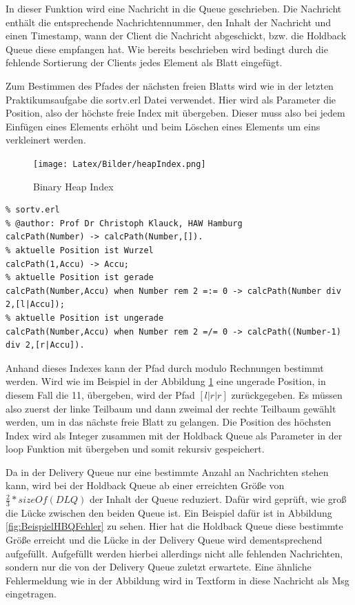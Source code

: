 In dieser Funktion wird eine Nachricht in die Queue geschrieben. Die Nachricht enthält die entsprechende Nachrichtennummer, den Inhalt der Nachricht und einen Timestamp, wann der Client die Nachricht abgeschickt, bzw. die Holdback Queue diese empfangen hat. Wie bereits beschrieben wird bedingt durch die fehlende Sortierung der Clients jedes Element als Blatt eingefügt.
 
Zum Bestimmen des Pfades der nächsten freien Blatts wird wie in der letzten Praktikumsaufgabe die sortv.erl Datei \cite{sortv} verwendet. Hier wird als Parameter die Position, also der höchste freie Index mit übergeben. Dieser muss also bei jedem Einfügen eines Elements erhöht und beim Löschen eines Elements um eins verkleinert werden. 

\begin{figure}[htbp]
\begin{center}
\texttt{[image: Latex/Bilder/heapIndex.png]}
\caption[Binary Heap Index]{Binary Heap Index\footnotemark}\label{fig:binHeapIndex}
\end{center}
\end{figure}

\begin{lstlisting}
% sortv.erl
% @author: Prof Dr Christoph Klauck, HAW Hamburg 
calcPath(Number) -> calcPath(Number,[]).
% aktuelle Position ist Wurzel
calcPath(1,Accu) -> Accu;
% aktuelle Position ist gerade
calcPath(Number,Accu) when Number rem 2 =:= 0 -> calcPath(Number div 2,[l|Accu]);
% aktuelle Position ist ungerade
calcPath(Number,Accu) when Number rem 2 =/= 0 -> calcPath((Number-1) div 2,[r|Accu]).	
\end{lstlisting}

Anhand dieses Indexes kann der Pfad durch modulo Rechnungen bestimmt werden. Wird wie im Beispiel in der Abbildung \ref{fig:binHeapIndex} eine ungerade Position, in diesem Fall die 11, übergeben, wird der Pfad $[l|r|r]$ zurückgegeben. Es müssen also zuerst der linke Teilbaum und dann zweimal der rechte Teilbaum gewählt werden, um in das nächste freie Blatt zu gelangen.
Die Position des höchsten Index wird als Integer zusammen mit der Holdback Queue als Parameter in der loop Funktion mit übergeben und somit rekursiv gespeichert. 

Da in der Delivery Queue nur eine bestimmte Anzahl an Nachrichten stehen kann, wird bei der Holdback Queue ab einer erreichten Größe von $\frac{2}{3}*sizeOf(DLQ)$ der Inhalt der Queue reduziert. Dafür wird geprüft, wie groß die Lücke zwischen den beiden Queue ist. Ein Beispiel dafür ist in Abbildung \ref{fig:BeispielHBQFehler} zu sehen. Hier hat die Holdback Queue diese bestimmte Größe erreicht und die Lücke in der Delivery Queue wird dementsprechend aufgefüllt. Aufgefüllt werden hierbei allerdings nicht alle fehlenden Nachrichten, sondern nur die von der Delivery Queue zuletzt erwartete. Eine ähnliche Fehlermeldung wie in der Abbildung wird in Textform in diese Nachricht als Msg eingetragen. 

